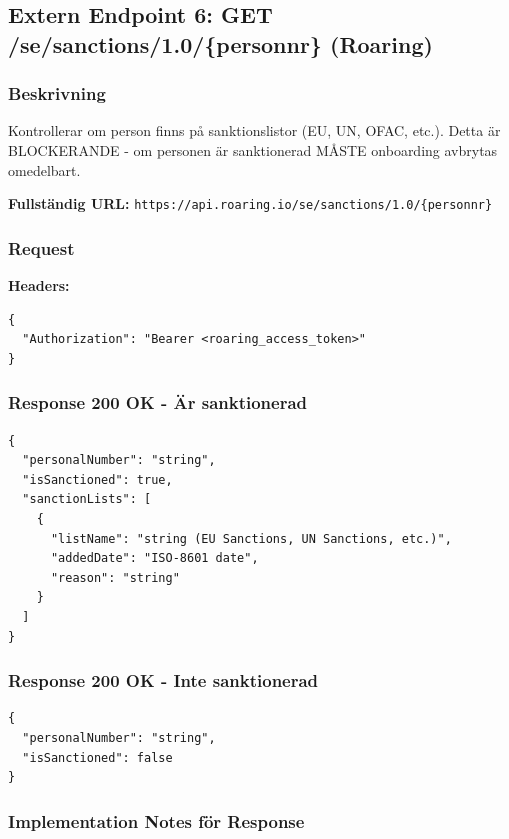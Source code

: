 \subsection{Extern Endpoint 6: GET /se/sanctions/1.0/\{personnr\} (Roaring)}

\subsubsection{Beskrivning}

Kontrollerar om person finns på sanktionslistor (EU, UN, OFAC, etc.). Detta är BLOCKERANDE - om personen är sanktionerad MÅSTE onboarding avbrytas omedelbart.

\textbf{Fullständig URL:} \texttt{https://api.roaring.io/se/sanctions/1.0/\{personnr\}}

\subsubsection{Request}

\textbf{Headers:}
\begin{lstlisting}
{
  "Authorization": "Bearer <roaring_access_token>"
}
\end{lstlisting}

\subsubsection{Response 200 OK - Är sanktionerad}

\begin{lstlisting}
{
  "personalNumber": "string",
  "isSanctioned": true,
  "sanctionLists": [
    {
      "listName": "string (EU Sanctions, UN Sanctions, etc.)",
      "addedDate": "ISO-8601 date",
      "reason": "string"
    }
  ]
}
\end{lstlisting}

\subsubsection{Response 200 OK - Inte sanktionerad}
\begin{lstlisting}
{
  "personalNumber": "string",
  "isSanctioned": false
}
\end{lstlisting}

\subsubsection{Implementation Notes för Response}

